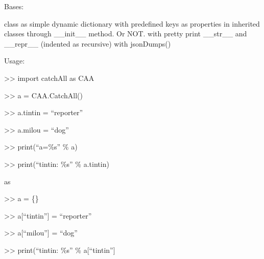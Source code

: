 \documentclass[a4paper,10pt,english]{sphinxmanual}
\begin{document}
\begin{fulllineitems}
\label{\detokenize{apidoc_src/src:src.catchAll.CatchAll}}
Bases: 

class as simple dynamic dictionary 
with predefined keys as properties in
inherited classes through \_\_init\_\_ method. Or NOT. 
with pretty print \_\_str\_\_ and \_\_repr\_\_ (indented as recursive)
with jsonDumps()

\begin{DUlineblock}{0em}
\item[] Usage:
\item[] \textgreater{}\textgreater{} import catchAll as CAA
\item[] \textgreater{}\textgreater{} a = CAA.CatchAll()
\item[] \textgreater{}\textgreater{} a.tintin = “reporter”
\item[] \textgreater{}\textgreater{} a.milou = “dog”
\item[] \textgreater{}\textgreater{} print(“a=\%s” \% a)
\item[] \textgreater{}\textgreater{} print(“tintin: \%s” \% a.tintin)
\item[] 
\item[] as
\end{DUlineblock}

\begin{DUlineblock}{0em}
\item[] \textgreater{}\textgreater{} a = \{\}
\item[] \textgreater{}\textgreater{} a{[}“tintin”{]} = “reporter”
\item[] \textgreater{}\textgreater{} a{[}“milou”{]} = “dog”
\item[] \textgreater{}\textgreater{} print(“tintin: \%s” \% a{[}“tintin”{]}
\end{DUlineblock}

\begin{fulllineitems}
\label{\detokenize{apidoc_src/src:src.catchAll.CatchAll.jsonDumps}}
\end{fulllineitems}


\end{fulllineitems}

\end{document}
